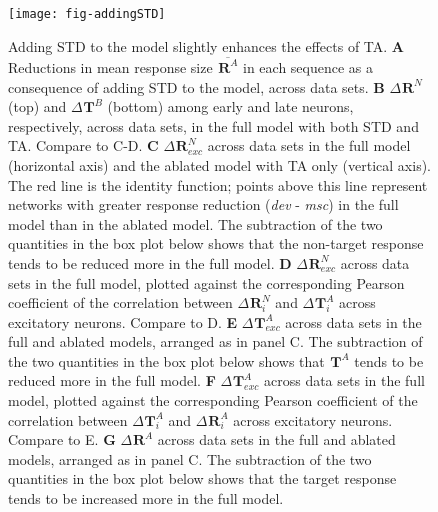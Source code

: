 \documentclass[9pt,lineno,onehalfspacing]{elife}
\newcommand{\dev}{\textit{dev}}
\newcommand{\msc}{\textit{msc}}
\newcommand{\R}[3][]{{}^{#1}_{}\boldsymbol R^{#2}_{#3}}
\newcommand{\T}[3][]{{}^{#1}_{}\boldsymbol T^{#2}_{#3}}
\newcommand{\mean}[1]{\overline{#1}}
\begin{document}
\begin{figure}
    \texttt{[image: fig-addingSTD]}
    \caption{%
        Adding STD to the model slightly enhances the effects of TA.
        \textbf{A} Reductions in mean response size $\mean{\R{A}{}}$ in each sequence as a consequence of adding STD to the model, across data sets.
        \textbf{B} $\Delta \R{N}{}$ (top) and $\Delta \T{B}{}$ (bottom) among early and late neurons, respectively, across data sets, in the full model with both STD and TA. Compare to C-D.
        \textbf{C} $\Delta \R{N}{exc}$ across data sets in the full model (horizontal axis) and the ablated model with TA only (vertical axis). The red line is the identity function; points above this line represent networks with greater response reduction (\dev{} - \msc{}) in the full model than in the ablated model. The subtraction of the two quantities in the box plot below shows that the non-target response tends to be reduced more in the full model.
        \textbf{D} $\Delta \R{N}{exc}$ across data sets in the full model, plotted against the corresponding Pearson coefficient of the correlation between $\Delta \R{N}{i}$ and $\Delta \T{A}{i}$ across excitatory neurons. Compare to D.
        \textbf{E} $\Delta \T{A}{exc}$ across data sets in the full and ablated models, arranged as in panel C. The subtraction of the two quantities in the box plot below shows that $\T{A}{}$ tends to be reduced more in the full model.
        \textbf{F} $\Delta \T{A}{exc}$ across data sets in the full model, plotted against the corresponding Pearson coefficient of the correlation between $\Delta \T{A}{i}$ and $\Delta \R{A}{i}$ across excitatory neurons. Compare to E.
        \textbf{G} $\Delta \R{A}{}$ across data sets in the full and ablated models, arranged as in panel C. The subtraction of the two quantities in the box plot below shows that the target response tends to be increased more in the full model.
    }
    \label{fig:addingSTD}
\end{figure}
\end{document}

